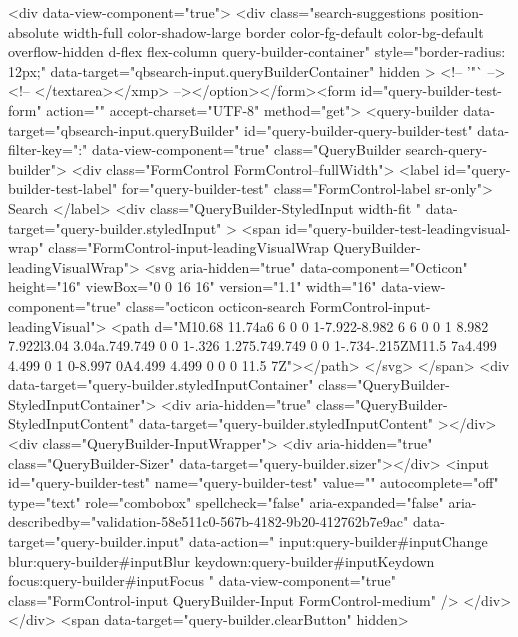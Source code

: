           <div data-view-component="true">        <div class="search-suggestions position-absolute width-full color-shadow-large border color-fg-default color-bg-default overflow-hidden d-flex flex-column query-builder-container"
          style="border-radius: 12px;"
          data-target="qbsearch-input.queryBuilderContainer"
          hidden
        >
          <!-- '"` --><!-- </textarea></xmp> --></option></form><form id="query-builder-test-form" action="" accept-charset="UTF-8" method="get">
  <query-builder data-target="qbsearch-input.queryBuilder" id="query-builder-query-builder-test" data-filter-key=":" data-view-component="true" class="QueryBuilder search-query-builder">
    <div class="FormControl FormControl--fullWidth">
      <label id="query-builder-test-label" for="query-builder-test" class="FormControl-label sr-only">
        Search
      </label>
      <div
        class="QueryBuilder-StyledInput width-fit "
        data-target="query-builder.styledInput"
      >
          <span id="query-builder-test-leadingvisual-wrap" class="FormControl-input-leadingVisualWrap QueryBuilder-leadingVisualWrap">
            <svg aria-hidden="true" data-component="Octicon" height="16" viewBox="0 0 16 16" version="1.1" width="16" data-view-component="true" class="octicon octicon-search FormControl-input-leadingVisual">
    <path d="M10.68 11.74a6 6 0 0 1-7.922-8.982 6 6 0 0 1 8.982 7.922l3.04 3.04a.749.749 0 0 1-.326 1.275.749.749 0 0 1-.734-.215ZM11.5 7a4.499 4.499 0 1 0-8.997 0A4.499 4.499 0 0 0 11.5 7Z"></path>
</svg>
          </span>
        <div data-target="query-builder.styledInputContainer" class="QueryBuilder-StyledInputContainer">
          <div
            aria-hidden="true"
            class="QueryBuilder-StyledInputContent"
            data-target="query-builder.styledInputContent"
          ></div>
          <div class="QueryBuilder-InputWrapper">
            <div aria-hidden="true" class="QueryBuilder-Sizer" data-target="query-builder.sizer"></div>
            <input id="query-builder-test" name="query-builder-test" value="" autocomplete="off" type="text" role="combobox" spellcheck="false" aria-expanded="false" aria-describedby="validation-58e511c0-567b-4182-9b20-412762b7e9ac" data-target="query-builder.input" data-action="
          input:query-builder#inputChange
          blur:query-builder#inputBlur
          keydown:query-builder#inputKeydown
          focus:query-builder#inputFocus
        " data-view-component="true" class="FormControl-input QueryBuilder-Input FormControl-medium" />
          </div>
        </div>
          <span data-target="query-builder.clearButton" hidden>
